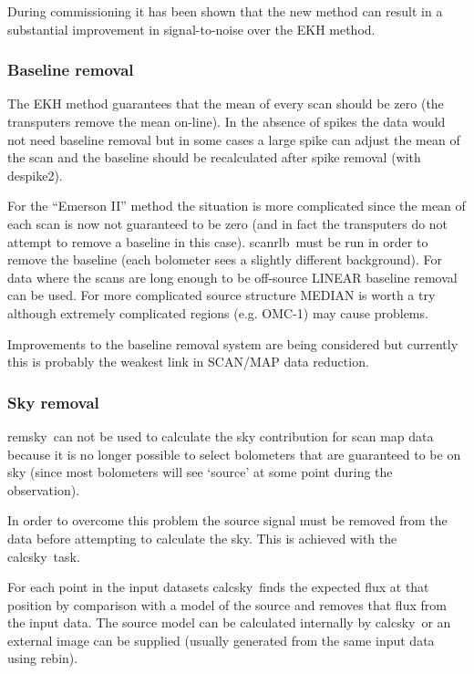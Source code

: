 \documentclass[twoside,11pt]{article}
\newcommand{\task}[1]{{\sf #1}}
\newcommand{\rebin}{\htmlref{\task{rebin}}{REBIN}}
\newcommand{\calcsky}{\htmlref{\task{calcsky}}{CALCSKY}}
\newcommand{\remsky}{\htmlref{\task{remsky}}{REMSKY}}
\newcommand{\despikeb}{\htmlref{\task{despike2}}{DESPIKE2}}
\newcommand{\scanrlb}{\htmlref{\task{scan\_rlb}}{SCAN_RLB}}
\newcommand{\htmlref}[2]{#1}
\renewcommand{\_}{\texttt{\symbol{95}}}
\begin{document}
During commissioning it has been shown that the new method can result in 
a substantial improvement in signal-to-noise over the EKH
method\cite{spietj}. 

\subsubsection{Baseline removal}

The EKH method guarantees that the mean of every scan should be zero
(the transputers remove the mean on-line). In the absence of spikes
the data would not need baseline removal but in some cases a large spike
can adjust the mean of the scan and the baseline should be recalculated
after spike removal (with \despikeb).

For the ``Emerson II'' method the situation is more complicated
since the mean of each scan is now not guaranteed to be zero (and in
fact the transputers do not attempt to remove a baseline in this case).
\scanrlb\ must be run in order to remove the baseline (each bolometer
sees a slightly different background). For data where the scans
are long enough to be off-source LINEAR baseline removal can be used.
For more complicated source structure MEDIAN is worth a try although
extremely complicated regions (e.g. OMC-1) may cause problems. 

Improvements to the baseline removal system are being considered but
currently this is probably the weakest link in SCAN/MAP data reduction.

\subsubsection{Sky removal\label{scan:sky}}

\remsky\ can not be used to calculate the sky contribution for scan
map data because it is no longer possible to select bolometers that
are guaranteed to be on sky (since most bolometers will see `source'
at some point during the observation).

In order to overcome this problem the source signal must be removed
from the data before attempting to calculate the sky. This is achieved
with the \calcsky\ task.

For each point in the input datasets \calcsky\ finds the expected flux
at that position by comparison with a model of the source and removes
that flux from the input data. The source model can be calculated internally
by \calcsky\ or an external image can be supplied (usually generated from
the same input data using \rebin). 
\end{document}
